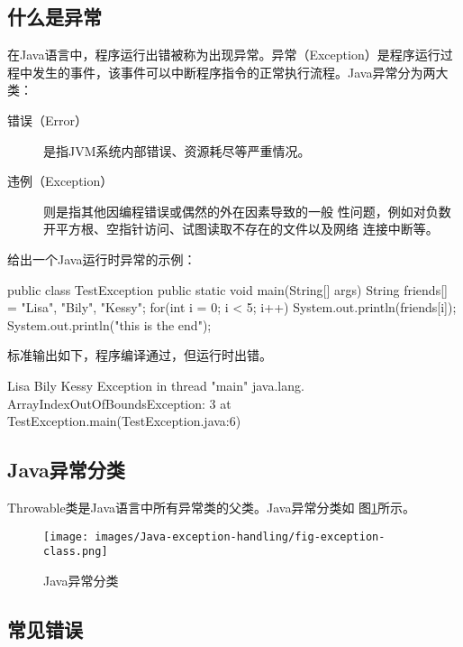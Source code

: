 \subsection{什么是异常}

在Java语言中，程序运行出错被称为出现异常。异常（Exception）是程序运行过
程中发生的事件，该事件可以中断程序指令的正常执行流程。Java异常分为两大类：

\begin{description}
\item[错误（Error）] 是指JVM系统内部错误、资源耗尽等严重情况。
\item[违例（Exception）] 则是指其他因编程错误或偶然的外在因素导致的一般
  性问题，例如对负数开平方根、空指针访问、试图读取不存在的文件以及网络
  连接中断等。
\end{description}

给出一个Java运行时异常的示例：


\begin{javaCode}
public class TestException {
  public static void main(String[] args) {
    String friends[] = {"Lisa", "Bily", "Kessy"};
    for(int i = 0; i < 5; i++) {
      System.out.println(friends[i]);
    }
    System.out.println("\n this is the end");
  }
}
\end{javaCode}

标准输出如下，程序编译通过，但运行时出错。

\begin{stdoutCode}
Lisa
Bily
Kessy
Exception in thread "main" java.lang.
ArrayIndexOutOfBoundsException: 3
at TestException.main(TestException.java:6)
\end{stdoutCode}

\subsection{Java异常分类}
 
Throwable类是Java语言中所有异常类的父类。Java异常分类如
图\ref{fig:exception-class}所示。

\begin{figure}[h]
\centering
\texttt{[image: images/Java-exception-handling/fig-exception-class.png]}
\caption{Java异常分类}
\label{fig:exception-class}
\end{figure}

\subsection{常见错误}

